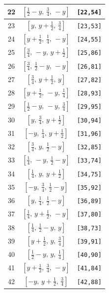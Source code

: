 \documentclass[fleqn,8pt]{jsarticle}
\begin{document}
\begin{longtable}{ccc}
22 & $\left[ \frac{1}{2} - y,\, \frac{3}{4},\, - y \right]$ & {\tt [22,54]} \\ \hline
23 & $\left[ y,\, y + \frac{1}{2},\, \frac{3}{4} \right]$ & {\tt [23,53]} \\ \hline
24 & $\left[ y + \frac{1}{2},\, \frac{1}{4},\, - y \right]$ & {\tt [24,55]} \\ \hline
25 & $\left[ \frac{3}{4},\, - y,\, y + \frac{1}{2} \right]$ & {\tt [25,86]} \\ \hline
26 & $\left[ \frac{3}{4},\, \frac{1}{2} - y,\, - y \right]$ & {\tt [26,81]} \\ \hline
27 & $\left[ \frac{3}{4},\, y + \frac{1}{2},\, y \right]$ & {\tt [27,82]} \\ \hline
28 & $\left[ y + \frac{1}{2},\, - y,\, \frac{1}{4} \right]$ & {\tt [28,93]} \\ \hline
29 & $\left[ \frac{1}{2} - y,\, - y,\, \frac{3}{4} \right]$ & {\tt [29,95]} \\ \hline
30 & $\left[ y,\, \frac{3}{4},\, y + \frac{1}{2} \right]$ & {\tt [30,94]} \\ \hline
31 & $\left[ - y,\, \frac{1}{4},\, y + \frac{1}{2} \right]$ & {\tt [31,96]} \\ \hline
32 & $\left[ \frac{3}{4},\, y,\, \frac{1}{2} - y \right]$ & {\tt [32,85]} \\ \hline
33 & $\left[ \frac{1}{4},\, - y,\, \frac{1}{2} - y \right]$ & {\tt [33,74]} \\ \hline
34 & $\left[ \frac{1}{4},\, y,\, y + \frac{1}{2} \right]$ & {\tt [34,75]} \\ \hline
35 & $\left[ - y,\, \frac{3}{4},\, \frac{1}{2} - y \right]$ & {\tt [35,92]} \\ \hline
36 & $\left[ y,\, \frac{1}{4},\, \frac{1}{2} - y \right]$ & {\tt [36,89]} \\ \hline
37 & $\left[ \frac{1}{4},\, y + \frac{1}{2},\, - y \right]$ & {\tt [37,80]} \\ \hline
38 & $\left[ \frac{1}{4},\, \frac{1}{2} - y,\, y \right]$ & {\tt [38,73]} \\ \hline
39 & $\left[ y + \frac{1}{2},\, y,\, \frac{3}{4} \right]$ & {\tt [39,91]} \\ \hline
40 & $\left[ \frac{1}{2} - y,\, y,\, \frac{1}{4} \right]$ & {\tt [40,90]} \\ \hline
41 & $\left[ y + \frac{1}{2},\, \frac{3}{4},\, - y \right]$ & {\tt [41,84]} \\ \hline
42 & $\left[ - y,\, y + \frac{1}{2},\, \frac{3}{4} \right]$ & {\tt [42,88]} \\ \hline

\end{longtable}
\end{document}

